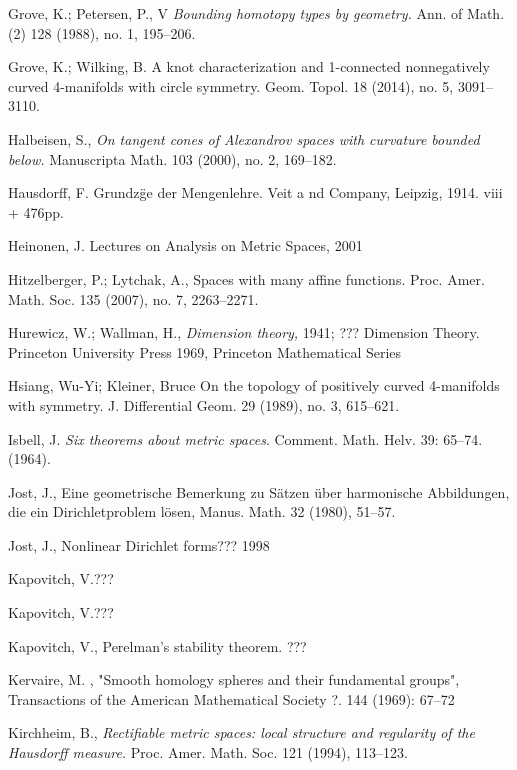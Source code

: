 \begin{thebibliography}{52}
 Grove, K.; Petersen, P., V
\textit{Bounding homotopy types by geometry.}
Ann. of Math. (2) 128 (1988), no. 1, 195--206.

 Grove, K.; Wilking, B.
A knot characterization and 1-connected nonnegatively curved 4-manifolds with circle symmetry. 
Geom. Topol. 18 (2014), no. 5, 3091--3110. 


 Halbeisen, S., \textit{On tangent cones of Alexandrov spaces with curvature
bounded below.}  Manuscripta Math.  103  (2000),  no. 2, 169--182.

  Hausdorff, F. Grundz\"ge der Mengenlehre. Veit a nd  Company, Leipzig, 1914. viii + 476pp.

Heinonen, J.
Lectures on Analysis on Metric Spaces,
2001


Hitzelberger, P.; Lytchak, A.,
Spaces with many affine functions. 
Proc. Amer. Math. Soc. 135 (2007), no. 7, 2263--2271.


 Hurewicz, W.; Wallman, H., \textit{Dimension theory,} 1941;
???  Dimension Theory. Princeton University Press 1969,
       Princeton Mathematical Series
       
Hsiang, Wu-Yi; Kleiner, Bruce
On the topology of positively curved 4-manifolds with symmetry.
J. Differential Geom. 29 (1989), no. 3, 615--621. 

 Isbell, J. \textit{Six theorems about metric spaces}. Comment. Math. Helv. 39: 65--74.(1964).

 Jost, J.,
Eine geometrische Bemerkung zu S\"atzen \"uber
harmonische Abbildungen, die ein Dirichletproblem l\"osen,
Manus. Math. 32  (1980),  51--57.

 Jost, J., Nonlinear Dirichlet forms??? 1998

Kapovitch, V.???

Kapovitch, V.???

 Kapovitch, V.,  Perelman's stability theorem. ???

 Kervaire, M. , "Smooth homology spheres and their fundamental groups", Transactions of the American Mathematical Society ?. 144 (1969): 67--72

 Kirchheim, B.,  \textit{Rectifiable metric spaces: local structure and regularity of the Hausdorff measure.} Proc. Amer. Math. Soc. 121 (1994), 113--123.


\end{thebibliography}

